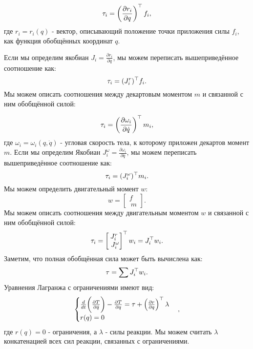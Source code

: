 \begin{equation}
	\tau_i = \left( \frac{\partial {r}_i}{\partial {q}} \right)^\top {f}_i,
\end{equation}
%
где ${r}_i = {r}_i({q})$ - вектор, описывающий положение точки приложения силы ${f}_i$, как функция обобщённых координат ${q}$.

Если мы определим якобиан ${J}_i = \frac{\partial {r}_i}{\partial {q}}$, мы можем переписать вышеприведённое соотношение как:
%
\begin{equation}
	\tau_i = ({J}^r_i)^\top {f}_i.
\end{equation}
Мы можем описать соотношения между декартовым моментом ${m}$ и связанной с ним обобщённой силой:

\begin{equation}
	\tau_i = \left( \frac{\partial \omega_i}{\partial \dot{{q}}} \right)^\top {m}_i,
\end{equation}
%
где $\omega_i = \omega_i({q}, \dot{{q}})$ - угловая скорость тела, к которому приложен декартов момент ${m}$.
Если мы определим Якобиан ${J}^\omega_i = \frac{\partial \omega_i}{\partial \dot{{q}}}$, мы можем переписать вышеприведённое соотношение как:
%
\begin{equation}
\tau_i = ({J}^\omega_i)^\top {m}_i.
\end{equation}
Мы можем определить двигательный момент ${w}$:
\begin{equation}
	{w} = \begin{bmatrix}
		{f} \\\ {m}
	\end{bmatrix}.
\end{equation}
%
Мы можем описать соотношения между двигательным моментом ${w}$ и связанной с ним обобщённой силой:
%
\begin{equation}
	\tau_i = \begin{bmatrix}
		{J}^r_i \\\ {J}^\omega_i
	\end{bmatrix}^\top
	{w}_i
	=
	{J}_i^\top {w}_i.
\end{equation}
Заметим, что полная обобщённая сила может быть вычислена как:
%
\begin{equation}
	\tau = \sum {J}_i^\top {w}_i.
\end{equation}
%
Уравнения Лагранжа с ограничениями имеют вид:
%
\begin{equation}
	\begin{cases}
		\frac{d}{dt} \bigg( 
		\frac{\partial T }{\partial \dot{{q}}}
		\bigg) - 
		\frac{\partial T }{\partial {q}} = \tau + \left( \frac{\partial {r}}{\partial {q}} \right)^\top \lambda
		\\
		{r}({q}) = 0
	\end{cases},
\end{equation}
%
где ${r}({q}) = 0$ - ограничения, а $\lambda$ - силы реакции. Мы можем считать $\lambda$ конкатенацией всех сил реакции, связанных с ограничениями.

